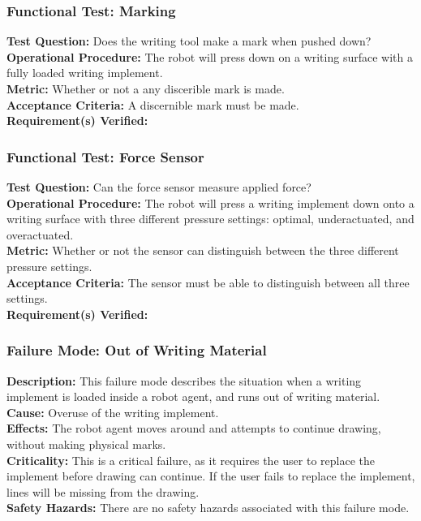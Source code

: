 \subsubsection{Functional Test: Marking}
\label{test:writing_ft_mark}
\textbf{Test Question:} Does the writing tool make a mark when pushed down? \\
\textbf{Operational Procedure:} The robot will press down on a writing surface with a fully loaded writing implement. \\
\textbf{Metric:} Whether or not a any discerible mark is made. \\
\textbf{Acceptance Criteria:} A discernible mark must be made.\\
\textbf{Requirement(s) Verified:} 

\subsubsection{Functional Test: Force Sensor}
\label{test:writing_ft_force}
\textbf{Test Question:} Can the force sensor measure applied force? \\
\textbf{Operational Procedure:} The robot will press a writing implement down onto a writing surface with three different pressure settings: optimal, underactuated, and overactuated.\\
\textbf{Metric:} Whether or not the sensor can distinguish between the three different pressure settings. \\
\textbf{Acceptance Criteria:} The sensor must be able to distinguish between all three settings.\\
\textbf{Requirement(s) Verified:} 


\subsubsection{Failure Mode: Out of Writing Material}
\label{sec:writing_fm_ink}
\textbf{Description:} This failure mode describes the situation when a writing implement is loaded inside a robot agent, and runs out of writing material. \\
\textbf{Cause:} Overuse of the writing implement.\\
\textbf{Effects:} The robot agent moves around and attempts to continue drawing, without making physical marks.\\
\textbf{Criticality:} This is a critical failure, as it requires the user to replace the implement before drawing can continue. If the user fails to replace the implement, lines will be missing from the drawing.\\
\textbf{Safety Hazards:} There are no safety hazards associated with this failure mode.\\

